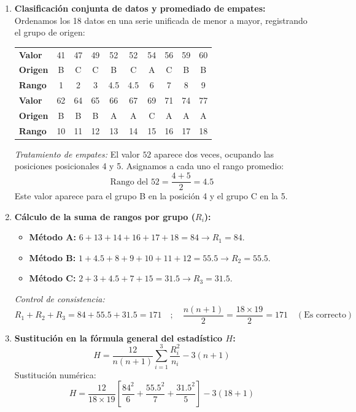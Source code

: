 \documentclass[11pt,a4paper]{article}
\begin{document}
\begin{enumerate}
    \item \textbf{Clasificación conjunta de datos y promediado de empates:}
    Ordenamos los 18 datos en una serie unificada de menor a mayor, registrando el grupo de origen:
    \begin{center}
    \small
    \begin{tabular}{l ccccccccc}
        \toprule
        \textbf{Valor} & 41 & 47 & 49 & 52 & 52 & 54 & 56 & 59 & 60 \\
        \textbf{Origen} & B & C & C & B & C & A & C & B & B \\
        \textbf{Rango} & 1 & 2 & 3 & 4.5 & 4.5 & 6 & 7 & 8 & 9 \\
        \midrule
        \textbf{Valor} & 62 & 64 & 65 & 66 & 67 & 69 & 71 & 74 & 77 \\
        \textbf{Origen} & B & B & B & A & A & C & A & A & A \\
        \textbf{Rango} & 10 & 11 & 12 & 13 & 14 & 15 & 16 & 17 & 18 \\
        \bottomrule
    \end{tabular}
    \end{center}
    \textit{Tratamiento de empates:} El valor $52$ aparece dos veces, ocupando las posiciones posicionales 4 y 5. Asignamos a cada uno el rango promedio:
    \[ \text{Rango del } 52 = \frac{4 + 5}{2} = 4.5 \]
    Este valor aparece para el grupo B en la posición 4 y el grupo C en la 5.

    \item \textbf{Cálculo de la suma de rangos por grupo ($R_i$):}
    \begin{itemize}
        \item \textbf{Método A:} $6 + 13 + 14 + 16 + 17 + 18 = 84 \rightarrow R_1 = 84$.
        \item \textbf{Método B:} $1 + 4.5 + 8 + 9 + 10 + 11 + 12 = 55.5 \rightarrow R_2 = 55.5$.
        \item \textbf{Método C:} $2 + 3 + 4.5 + 7 + 15 = 31.5 \rightarrow R_3 = 31.5$.
    \end{itemize}
    \textit{Control de consistencia:}
    \[ R_1 + R_2 + R_3 = 84 + 55.5 + 31.5 = 171 \quad ; \quad \frac{n(n+1)}{2} = \frac{18 \times 19}{2} = 171 \quad (\text{Es correcto}) \]

    \item \textbf{Sustitución en la fórmula general del estadístico $H$:}
    \[ H = \frac{12}{n(n+1)} \sum_{i=1}^{3} \frac{R_i^2}{n_i} - 3(n+1) \]
    Sustitución numérica:
    \[ H = \frac{12}{18 \times 19} \left[ \frac{84^2}{6} + \frac{55.5^2}{7} + \frac{31.5^2}{5} \right] - 3(18 + 1) \]


\end{enumerate}
\end{document}
